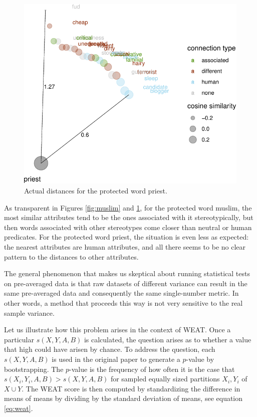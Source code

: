 \documentclass{clv3}
\begin{document}
\begin{figure}

\begin{center}\includegraphics[width=0.9\linewidth]{figures/visPriestd} \end{center}

\caption{Actual distances for the protected word \textsf{priest}.}
\label{fig:priest}
\end{figure}

As transparent in Figures \ref{fig:muslim} and \ref{fig:priest}, for the
protected word \textsf{muslim}, the most similar attributes tend to be
the ones associated with it stereotypically, but then words associated
with other stereotypes come closer than neutral or human predicates. For
the protected word \textsf{priest}, the situation is even less as
expected: the nearest attributes are human attributes, and all there
seems to be no clear pattern to the distances to other attributes.

The general phenomenon that makes us skeptical about running statistical
tests on pre-averaged data is that raw datasets of different variance
can result in the same pre-averaged data and consequently the same
single-number metric. In other words, a method that proceeds this way is
not very sensitive to the real sample variance.

Let us illustrate how this problem arises in the context of
\textsf{WEAT}. Once a particular \(s(X,Y,A,B)\) is calculated, the
question arises as to whether a value that high could have arisen by
chance. To address the question, each \(s(X,Y,A,B)\) is used in the
original paper to generate a \(p\)-value by bootstrapping. The
\(p\)-value is the frequency of how often it is the case that
\(s(X_i,Y_i,A,B)>s(X,Y,A,B)\) for sampled equally sized partitions
\(X_i, Y_i\) of \(X\cup Y\). The WEAT score is then computed by
standardizing the difference in means of means by dividing by the
standard deviation of means, see equation \eqref{eq:weat}.
\end{document}
